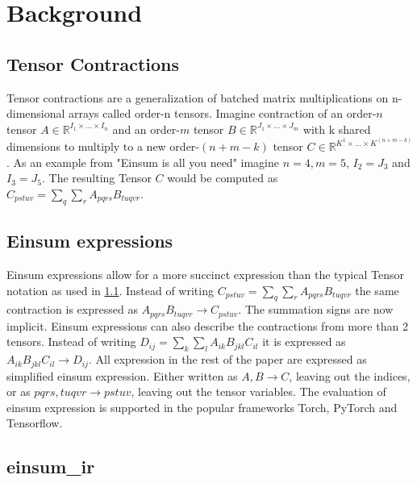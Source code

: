 \section{Background}

\subsection{Tensor Contractions}
\label{Tensorcontractions}

Tensor contractions are a generalization of batched matrix multiplications on n-dimensional arrays called order-n tensors.
Imagine contraction of an order-$n$ tensor $A \in \mathbb{R}^{I_1\times\dots\times I_n}$ and an order-$m$ tensor $B \in \mathbb{R}^{J_1\times\dots\times J_m}$ with k shared dimensions to multiply to a new order-$(n+m-k)$ tensor $C \in \mathbb{R}^{K^1\times\dots\times K^{(n+m-k)}}$.
As an example from "Einsum is all you need" \cite{einsum_is_all_you_need} imagine $n=4, m=5$, $I_2 = J_3$ and $I_3 = J_5$.
The resulting Tensor $C$ would be computed as $C_{pstuv}=\sum_{q}\sum_{r}A_{pqrs}B_{tuqvr}$.

\subsection{Einsum expressions}

Einsum expressions allow for a more succinct expression than the typical Tensor notation as used in \ref{Tensorcontractions}.
Instead of writing $C_{pstuv}=\sum_{q}\sum_{r}A_{pqrs}B_{tuqvr}$ the same contraction is expressed as $A_{pqrs}B_{tuqvr} \rightarrow C_{pstuv}$.
The summation signs are now implicit.
Einsum expressions can also describe the contractions from more than 2 tensors\cite{einsum_is_all_you_need}.
Instead of writing $D_{ij} = \sum_{k}\sum_{l}A_{ik}B_{jkl}C_{il}$ it is expressed as $A_{ik}B_{jkl}C_{il} \rightarrow D_{ij}$.
All expression in the rest of the paper are expressed as simplified einsum expression.
Either written as $A,B\rightarrow C$, leaving out the indices, or as $pqrs,tuqvr \rightarrow pstuv$, leaving out the tensor variables.
The evaluation of einsum expression is supported in the popular frameworks Torch\cite{torch}, PyTorch\cite{pytorch} and Tensorflow\cite{tensorflow}.

\subsection{einsum\_ir}

